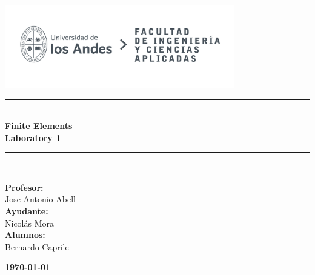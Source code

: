 \documentclass{article}  %
\begin{document}
\begin{titlepage}%
\newcommand{\HRule}{\rule{\linewidth}{0.5mm}} 
\center 
\includegraphics[width=10cm]{LOGO_UNIVERSIDAD.jpg}\\ %
\vspace{3cm}
\HRule \\[0.4cm]
{ \huge \bfseries Finite Elements}\\[0.4cm] %
{ \huge \bfseries Laboratory 1}\\[0.4cm] %
\HRule \\[1.5cm]
 \vspace{5cm}
\begin{flushright}
  { \textbf{Profesor:}\\
  Jose Antonio Abell\\
  \textbf{Ayudante:}\\
  Nicolás Mora\\
  \textbf{Alumnos:} \\
  Bernardo Caprile\\
}
\end{flushright}
\vspace{1cm}
{\large \textbf{\today}}\\[2cm] %
\end{titlepage}
\end{document}
